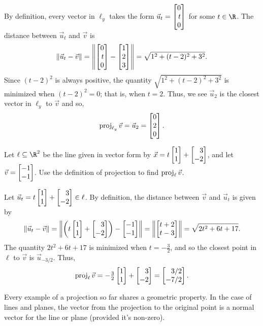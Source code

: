 By definition, every vector in $\ell_y$ takes the form $\vec u_t=\mat{0\\t\\0}$ for some $t\in \R$. The distance
between $\vec u_t$ and $\vec v$ is
\[
	\Norm{\vec u_t-\vec v}=\norm*{\mat{0\\t\\0}-\mat{1\\2\\3}} = \sqrt{1^2+(t-2)^2+3^2}.
\]
Since $(t-2)^2$ is always positive, the quantity $\sqrt{1^2+(t-2)^2+3^2}$ is minimized when $(t-2)^2=0$; that is,
when $t=2$. Thus, we see $\vec u_2$ is the closest vector in $\ell_y$ to $\vec v$ and so,
\[
	\Proj_{\ell_y}\vec v=\vec u_2=\mat{0\\2\\0}.
\]


\begin{example}
	Let $\ell\subseteq \R^2$ be the line given in vector form by $\vec x=t\mat{1\\1}+\mat{3\\-2}$,
	and let $\vec v=\mat{-1\\-1}$. Use the definition of projection to find $\operatorname{proj}_\ell \vec v$.

	Let $\vec u_t=t\mat{1\\1}+\mat{3\\-2}\in\ell$.
	By definition, the distance between $\vec v$ and $\vec u_t$ is given by
	\[
		\Norm{\vec u_t-\vec v}=\norm*{\left(t\mat{1\\1}+\mat{3\\-2}\right)-\mat{-1\\-1}} = \norm*{\mat{t+2\\t-3}}
	    =\sqrt{2t^2+6t+17}.
	\]
	The quantity $2t^2+6t+17$ is minimized when $t=-\frac{3}{2}$, and so the closest point
	in $\ell$ to $\vec v$ is $\vec u_{-3/2}$. Thus,
	\[
	    \Proj_\ell \vec v=-\tfrac{3}{2}\mat{1\\1}+\mat{3\\-2}=\mat{3/2\\-7/2}.
	\]
\end{example}

Every example of a projection so far shares a geometric property. In the case of lines and planes,
the vector from the  projection to the original point is a normal vector for the line or plane (provided it's non-zero).

